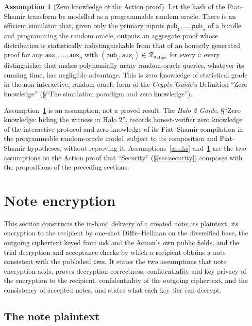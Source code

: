 \documentclass[11pt,a4paper]{article}
\theoremstyle{definition}
\newtheorem{assumption}[theorem]{Assumption}
\newcommand{\Rel}{\mathcal{R}}
\newcommand{\cmx}{\mathsf{cmx}}
\newcommand{\ovk}{\ensuremath{\mathsf{ovk}}}
\begin{document}
\begin{assumption}[Zero knowledge of the Action proof]\label{ass:zk}
Let the hash of the Fiat--Shamir transform be modelled as a programmable
random oracle. There is an efficient simulator that, given only the primary
inputs $\mathsf{pub}_1, \dots, \mathsf{pub}_n$ of a bundle and programming
the random oracle, outputs an aggregate proof whose distribution is
statistically indistinguishable from that of an honestly generated proof for
any $\mathsf{aux}_1, \dots, \mathsf{aux}_n$ with
$(\mathsf{pub}_i, \mathsf{aux}_i) \in \Rel_{\mathsf{Action}}$ for every $i$:
every distinguisher that makes polynomially many random-oracle queries,
whatever its running time, has negligible advantage. This is zero knowledge
of statistical grade in the non-interactive, random-oracle form of the
\emph{Crypto Guide}'s Definition ``Zero knowledge'' (\S``The simulation
paradigm and zero knowledge'').
\end{assumption}

Assumption~\ref{ass:zk} is an assumption, not a proved result. The
\emph{Halo 2 Guide}, \S``Zero knowledge: hiding the witness in Halo 2'',
records honest-verifier zero knowledge of the interactive protocol and zero
knowledge of its Fiat--Shamir compilation in the programmable random-oracle
model, subject to its composition and Fiat--Shamir hypotheses, without
reproving it. Assumptions~\ref{ass:ks} and~\ref{ass:zk} are the two
assumptions on the Action proof that ``Security'' (\S\ref{sec:security})
composes with the propositions of the preceding sections.

\section{Note encryption}\label{sec:enc}

This section constructs the in-band delivery of a created note: its
plaintext, its encryption to the recipient by one-shot Diffie--Hellman on the
diversified base, the outgoing ciphertext keyed from $\ovk$ and the Action's
own public fields, and the trial decryption and acceptance checks by which a
recipient obtains a note consistent with the published $\cmx$. It states the
two assumptions that note encryption adds, proves decryption correctness,
confidentiality and key privacy of the encryption to the recipient,
confidentiality of the outgoing ciphertext, and the consistency of accepted
notes, and states what each key tier can decrypt.

\subsection{The note plaintext}\label{sec:enc-plaintext}
\end{document}
